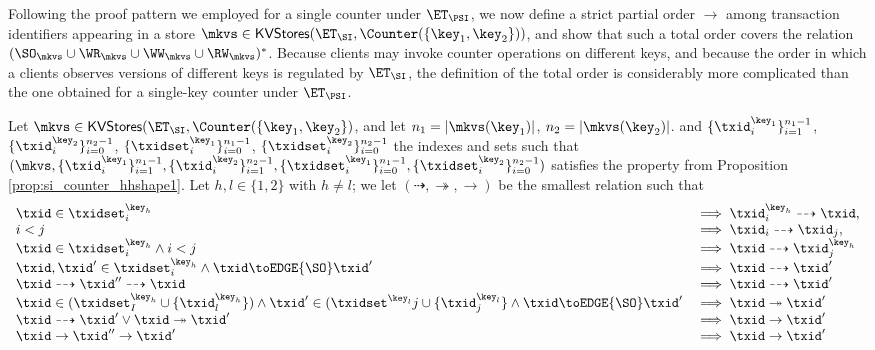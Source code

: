 Following the proof pattern we employed for a single counter under $\ET_{\PSI}$, we now 
define a strict partial order $\rightarrow$ among transaction identifiers appearing in a store 
$\mkvs \in \mathsf{KVStores}(\ET_{\SI},  \Counter(\{\key_1, \key_2\}))$, and show that such a 
total order covers the relation $(\SO_{\mkvs} \cup \WR_{\mkvs} \cup \WW_{\mkvs} \cup \RW_{\mkvs})^{\ast}$. 
Because clients may invoke counter operations on different keys, and because the 
order in which a clients observes versions of different keys is regulated by $\ET_{\SI}$, 
the definition of the total order is considerably more complicated than the one 
obtained for a single-key counter under $\ET_\PSI$.

\begin{definition}
\label{def:si_counter_order}
Let $\mkvs \in \mathsf{KVStores}(\ET_{\SI}, \Counter(\{\key_1, \key_2\})$, and let 
$n_1 = \lvert \mkvs(\key_1) \rvert$, $n_2 = \lvert \mkvs(\key_2) \rvert$. 
and $\{\txid_{i}^{\key_1}\}_{i=1}^{n_1 - 1}$, $\{\txid_{i}^{\key_2}\}_{i=0}^{n_2 - 1}$, 
$\{\txidset_{i}^{\key_1}\}_{i=0}^{n_1-1}$, $\{\txidset_{i}^{\key_2}\}_{i=0}^{n_2 - 1}$ the indexes 
and sets such that $(\mkvs, \{\txid_{i}^{\key_{1}}\}_{i=1}^{n_1 - 1}, \{\txid^{\key_2}_{i}\}_{i=1}^{n_2 - 1}, 
\{\txidset_{i}^{\key_1}\}_{i=0}^{n_1 - 1}, \{\txidset_{i}^{\key_2}\}_{i=0}^{n_2-1})$ satisfies the property from 
Proposition \ref{prop:si_counter_hhshape1}. Let $h, l \in \{1,2\}$ with $h \neq l$; we 
let $(\dashrightarrow, \twoheadrightarrow, \rightarrow)$ be the smallest relation such that 
\[
\begin{array}{ll}
\txid \in \txidset^{\key_{h}}_{i} &\implies \txid^{\key_{h}}_{i} \dashrightarrow \txid,\\
i < j &\implies \txid_{i} \dashrightarrow \txid_{j},\\
\txid \in \txidset^{\key_{h}}_{i} \wedge i < j & \implies \txid \dashrightarrow \txid^{\key_{h}}_{j}\\
\txid, \txid' \in \txidset^{\key_{h}}_{i} \wedge \txid \toEDGE{\SO} \txid' &\implies \txid \dashrightarrow \txid'\\
\txid \dashrightarrow \txid'' \dashrightarrow \txid &\implies \txid \dashrightarrow \txid'\\
\txid \in (\txidset^{\key_{h}}_{I} \cup \{\txid^{\key_{h}}_{l}\}) \wedge \txid' \in (\txidset^{\key_{l}}{j} \cup \{\txid^{\key_l}_{j}\} \wedge \txid \toEDGE{\SO} \txid' &\implies \txid \twoheadrightarrow \txid'\\
\txid \dashrightarrow \txid' \vee \txid \twoheadrightarrow \txid' &\implies \txid \rightarrow \txid'\\
\txid \rightarrow \txid'' \rightarrow \txid' &\implies \txid \rightarrow \txid'
\end{array}
\]
%
\end{definition}
